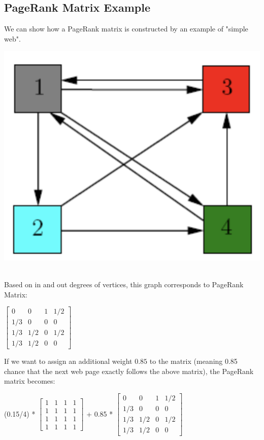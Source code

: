 \documentclass[12pt]{article}
\begin{document}
\subsection{PageRank Matrix Example}
We can show how a PageRank matrix is constructed by an example of "simple web".\\
\begin{center}\includegraphics[]{images/simple_web.png}\end{center}\\
Based on in and out degrees of vertices, this graph corresponds to PageRank Matrix:\begin{center}
$
\begin{bmatrix}
0 & 0 & 1 & 1/2\\
1/3 & 0 & 0 & 0\\
1/3 & 1/2 & 0 & 1/2\\
1/3 & 1/2 & 0 & 0
\end{bmatrix}
$\\
\end{center}
If we want to assign an additional weight $0.85$ to the matrix (meaning 0.85 chance that the next web page exactly follows the above matrix), the PageRank matrix becomes: \begin{center}
(0.15/4) * $
\begin{bmatrix}
1 & 1 & 1 & 1\\
1 & 1 & 1 & 1\\
1 & 1 & 1 & 1\\
1 & 1 & 1 & 1
\end{bmatrix}
$  + 0.85 * $
\begin{bmatrix}
0 & 0 & 1 & 1/2\\
1/3 & 0 & 0 & 0\\
1/3 & 1/2 & 0 & 1/2\\
1/3 & 1/2 & 0 & 0
\end{bmatrix}
$
\end{center}
\end{document}
